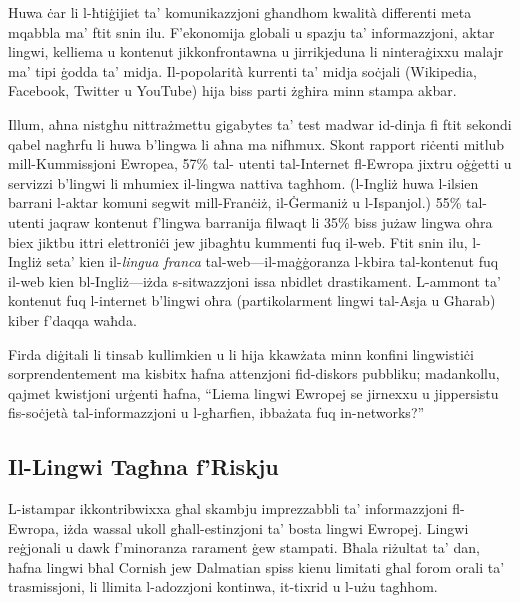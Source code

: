 \documentclass[]{../../metanetpaper}
\begin{document}
\begin{multicols}{2}

Huwa ċar li l-ħtiġijiet ta’ komunikazzjoni għandhom kwalità differenti meta mqabbla ma’ ftit snin ilu. F’ekonomija globali u spazju ta’ informazzjoni, aktar lingwi, kelliema u kontenut  jikkonfrontawna u jirrikjeduna li ninteraġixxu malajr ma’ tipi ġodda ta’ midja. Il-popolarità kurrenti ta’ midja soċjali (Wikipedia, Facebook, Twitter u YouTube) hija biss parti żgħira minn stampa akbar.

Illum, aħna nistgħu nittrażmettu gigabytes ta’ test madwar id-dinja fi ftit sekondi qabel nagħrfu li huwa b’lingwa li aħna ma nifhmux. Skont rapport riċenti mitlub mill-Kummissjoni Ewropea, 57\% tal- utenti tal-Internet fl-Ewropa jixtru oġġetti u servizzi b’lingwi li mhumiex il-lingwa nattiva tagħhom. (l-Ingliż huwa l-ilsien barrani l-aktar komuni segwit mill-Franċiż, il-Ġermaniż u l-Ispanjol.) 55\% tal-utenti jaqraw kontenut f'lingwa barranija filwaqt li 35\% biss jużaw lingwa oħra biex jiktbu ittri elettroniċi jew jibagħtu kummenti fuq il-web\cite{EC1}.  Ftit snin ilu, l-Ingliż seta’ kien il-\emph{lingua franca} tal-web—il-maġġoranza l-kbira tal-kontenut fuq il-web kien bl-Ingliż—iżda s-sitwazzjoni issa nbidlet drastikament. L-ammont ta’ kontenut fuq l-internet b’lingwi oħra (partikolarment lingwi tal-Asja u Għarab) kiber f'daqqa waħda.

Firda diġitali li tinsab kullimkien u li hija kkawżata minn konfini lingwistiċi sorprendentement ma kisbitx ħafna attenzjoni fid-diskors pubbliku; madankollu, qajmet kwistjoni urġenti ħafna, ``Liema lingwi Ewropej se jirnexxu u jippersistu fis-soċjetà tal-informazzjoni u l-għarfien, ibbażata fuq in-networks?''

\subsection{Il-Lingwi Tagħna f’Riskju}

L-istampar ikkontribwixxa għal skambju imprezzabbli ta’ informazzjoni fl-Ewropa, iżda wassal ukoll għall-estinzjoni ta’ bosta lingwi Ewropej. Lingwi reġjonali u dawk f’minoranza rarament ġew stampati. Bħala riżultat ta’ dan, ħafna lingwi bħal Cornish jew Dalmatian spiss kienu limitati għal forom orali ta’ trasmissjoni, li llimita l-adozzjoni kontinwa, it-tixrid u l-użu tagħhom.
  

\end{multicols}
\end{document}
